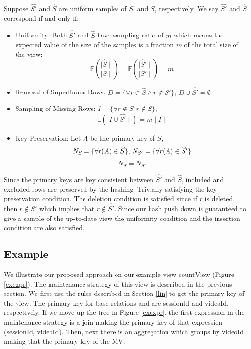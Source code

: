\begin{definition}[Correspondence]
Suppose $\widehat{S'}$ and $\widehat{S}$ are uniform samples of $S'$ and $S$, respectively.  We say $\widehat{S'}$ and $\widehat{S}$ correspond if and only if:
\vspace{-.25em}
\begin{itemize}[noitemsep]
\item Uniformity: Both $\widehat{S'}$ and $\widehat{S}$ have sampling ratio of $m$ which means the expected value of the size of the samples is a fraction $m$ of the total size of the view: \[\mathbb{E}(\frac{\mid\widehat{S}\mid}{\mid S \mid}) = \mathbb{E}(\frac{\mid\widehat{S}'\mid}{\mid S' \mid}) = m\]
\item Removal of Superfluous Rows: $D = \{\forall r \in \widehat{S} \wedge r \not\in S'\}$, $D \cup \widehat{S'} = \emptyset$
\item Sampling of Missing Rows: $I = \{\forall r \not\in S : r \not \in S\}$, \[\mathbb{E}(\mid I \cup \widehat{S'} \mid) = m\mid I \mid \]
\item Key Preservation: Let $A$ be the primary key of $S$, \[N_S = \{\forall r(A) \in \widehat{S}\}$, $N_{S'} = \{\forall r(A) \in \widehat{S}'\}\] \[N_S = N_{S'}\]
\end{itemize}
\vspace{-.25em}
\label{correspondence}
\end{definition}
Since the primary keys are key consistent between $\hat{S'}$ and $\hat{S}$, included and excluded rows are preserved by the hashing.
Trivially satisfying the key preservation condition.
The deletion condition is satisfied since if $r$ is deleted, then $r \not \in S'$ which implies that $r \not\in \hat{S'}$.
Since our hash push down is guaranteed to give a sample of the up-to-date view the uniformity condition and the insertion condition are also satisfied.

\subsection{Example}
We illustrate our proposed approach on our example view \textsf{countView} (Figure \ref{exexpr}).
The maintenance strategy of this view is described in the previous section.
We first use the rules described in Section \ref{lin} to get the primary key of the view.  
The primary key for base relations  and  are \textsf{sessionId} and \textsf{videoId}, respectively.
If we move up the tree in Figure \ref{exexpr}, the first expression in the maintenance strategy is a join making the primary key of that expression (\textsf{sessionId}, \textsf{videoId}).
Then, next there is an aggregation which groups by \textsf{videoId} making that the primary key of the MV.

